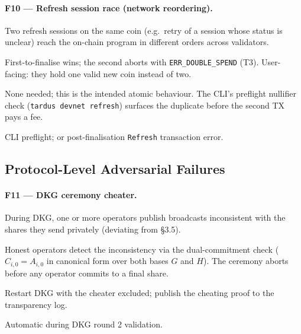\paragraph{F10 --- Refresh session race (network reordering).}
\begin{description}[leftmargin=2em,style=nextline,itemsep=0pt]
  \item[Trigger] Two refresh sessions on the same coin (e.g.\ retry
    of a session whose status is unclear) reach the on-chain program
    in different orders across validators.
  \item[Consequence] First-to-finalise wins; the second aborts with
    \texttt{ERR\_DOUBLE\_SPEND} (T3). User-facing: they hold one valid
    new coin instead of two.
  \item[Recovery] None needed; this is the intended atomic behaviour.
    The CLI's preflight nullifier check (\texttt{tardus devnet refresh})
    surfaces the duplicate before the second TX pays a fee.
  \item[Detection] CLI preflight; or post-finalisation \texttt{Refresh}
    transaction error.
\end{description}

\subsection{Protocol-Level Adversarial Failures}
\label{sec:failure-adversarial}

\paragraph{F11 --- DKG ceremony cheater.}
\begin{description}[leftmargin=2em,style=nextline,itemsep=0pt]
  \item[Trigger] During DKG, one or more operators publish broadcasts
    inconsistent with the shares they send privately (deviating from
    \S3.5).
  \item[Consequence] Honest operators detect the inconsistency via the
    dual-commitment check ($C_{i,0} = A_{i,0}$ in canonical form
    over both bases $G$ and $H$). The ceremony aborts before any
    operator commits to a final share.
  \item[Recovery] Restart DKG with the cheater excluded; publish the
    cheating proof to the transparency log.
  \item[Detection] Automatic during DKG round 2 validation.
\end{description}

